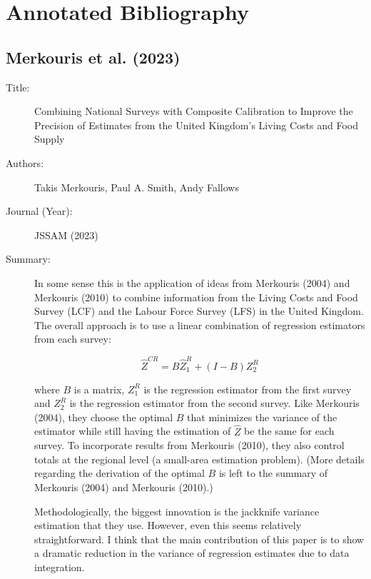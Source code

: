 \documentclass[12pt]{article}
\begin{document}

\section*{Annotated Bibliography}

\subsection*{Merkouris et al. (2023)}

\begin{description}
  \item[Title:] Combining National Surveys with Composite Calibration to Improve
    the Precision of Estimates from the United Kingdom's Living Costs and Food
    Supply

  \item[Authors:] Takis Merkouris, Paul A. Smith, Andy Fallows

  \item[Journal (Year):] JSSAM (2023)

  \item[Summary:] In some sense this is the application of ideas from Merkouris
    (2004) and Merkouris (2010) to combine information from the Living Costs and
    Food Survey (LCF) and the Labour Force Survey (LFS) in the United Kingdom.
    The overall approach is to use a linear combination of regression estimators
    from each survey:

    \[\hat Z^{CR} = B \hat Z_1^R + (I - B) Z_2^R\]

    where $B$ is a matrix, $Z_1^R$ is the regression estimator from the first
    survey and $Z_2^R$ is the regression estimator from the second survey. Like
    Merkouris (2004), they choose the optimal $B$ that minimizes the variance of
    the estimator while still having the estimation of $\hat Z$ be the same for
    each survey. To incorporate results from Merkouris (2010), they also control
    totals at the regional level (a small-area estimation problem). (More
    details regarding the derivation of the optimal $B$ is left to the summary
    of Merkouris (2004) and Merkouris (2010).) 

    Methodologically, the biggest innovation is the jackknife variance
    estimation that they use. However, even this seems relatively
    straightforward. I think that the main contribution of this paper is to show
    a dramatic reduction in the variance of regression estimates due to data
    integration.


\end{description}
\end{document}
